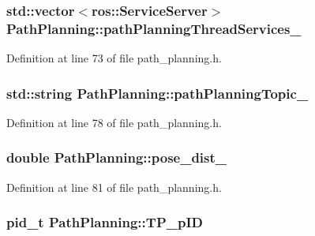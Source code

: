 \hypertarget{classPathPlanning_af4843567f14bcf61b51a40adf3a26842}{
\subsubsection[{path\-Planning\-Thread\-Services\-\_\-}]{\setlength{\rightskip}{0pt plus 5cm}std\-::vector$<$ros\-::\-Service\-Server$>$ Path\-Planning\-::path\-Planning\-Thread\-Services\-\_\-\hspace{0.3cm}{\ttfamily [private]}}}\label{classPathPlanning_af4843567f14bcf61b51a40adf3a26842}


Definition at line 73 of file path\-\_\-planning.\-h.

\hypertarget{classPathPlanning_a75832e9bcc3b6feb3ce17e9ea3f0b208}{
\subsubsection[{path\-Planning\-Topic\-\_\-}]{\setlength{\rightskip}{0pt plus 5cm}std\-::string Path\-Planning\-::path\-Planning\-Topic\-\_\-\hspace{0.3cm}{\ttfamily [private]}}}\label{classPathPlanning_a75832e9bcc3b6feb3ce17e9ea3f0b208}


Definition at line 78 of file path\-\_\-planning.\-h.

\hypertarget{classPathPlanning_ad1da5fbacd5f283a5b778bf4c1a29d0a}{
\subsubsection[{pose\-\_\-dist\-\_\-}]{\setlength{\rightskip}{0pt plus 5cm}double Path\-Planning\-::pose\-\_\-dist\-\_\-\hspace{0.3cm}{\ttfamily [private]}}}\label{classPathPlanning_ad1da5fbacd5f283a5b778bf4c1a29d0a}


Definition at line 81 of file path\-\_\-planning.\-h.

\hypertarget{classPathPlanning_a27d61d0eeb2e094043c517dd7ec380f4}{
\subsubsection[{T\-P\-\_\-p\-I\-D}]{\setlength{\rightskip}{0pt plus 5cm}pid\-\_\-t Path\-Planning\-::\-T\-P\-\_\-p\-I\-D\hspace{0.3cm}{\ttfamily [private]}}}\label{classPathPlanning_a27d61d0eeb2e094043c517dd7ec380f4}


